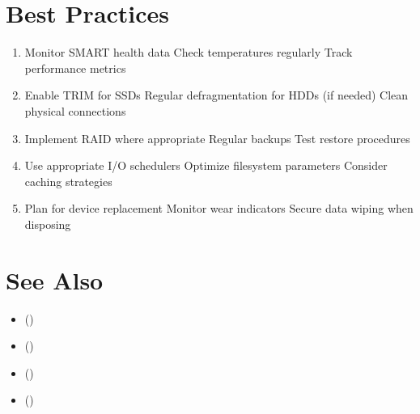 \documentclass[letterpaper,10pt,english]{sphinxmanual}
\begin{document}
\section{Best Practices}
\label{\detokenize{storage-devices:best-practices}}\begin{enumerate}
%
\item {} 
\sphinxAtStartPar
{}
\sphinxhyphen{} Monitor SMART health data
\sphinxhyphen{} Check temperatures regularly
\sphinxhyphen{} Track performance metrics

\item {} 
\sphinxAtStartPar
{}
\sphinxhyphen{} Enable TRIM for SSDs
\sphinxhyphen{} Regular defragmentation for HDDs (if needed)
\sphinxhyphen{} Clean physical connections

\item {} 
\sphinxAtStartPar
{}
\sphinxhyphen{} Implement RAID where appropriate
\sphinxhyphen{} Regular backups
\sphinxhyphen{} Test restore procedures

\item {} 
\sphinxAtStartPar
{}
\sphinxhyphen{} Use appropriate I/O schedulers
\sphinxhyphen{} Optimize filesystem parameters
\sphinxhyphen{} Consider caching strategies

\item {} 
\sphinxAtStartPar
{}
\sphinxhyphen{} Plan for device replacement
\sphinxhyphen{} Monitor wear indicators
\sphinxhyphen{} Secure data wiping when disposing

\end{enumerate}


\section{See Also}
\label{\detokenize{storage-devices:see-also}}\begin{itemize}
\item {} 
\sphinxAtStartPar
{\hyperref[\detokenize{disk-management::doc}]{}} ()

\item {} 
\sphinxAtStartPar
{\hyperref[\detokenize{file-systems::doc}]{}} ()

\item {} 
\sphinxAtStartPar
{\hyperref[\detokenize{raid-systems::doc}]{}} ()

\item {} 
\sphinxAtStartPar
{\hyperref[\detokenize{volume-management::doc}]{}} ()

\end{itemize}
\end{document}
